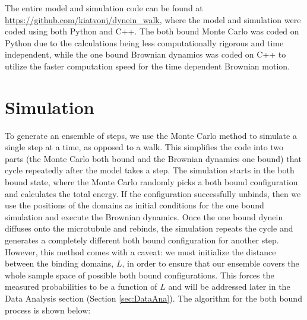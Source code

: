 
The entire model and simulation code can be found at \url{https://github.com/kiatvonj/dynein_walk}, where the model and simulation were coded using both Python and C++. The both bound Monte Carlo was coded on Python due to the calculations being less computationally rigorous and time independent, while the one bound Brownian dynamics was coded on C++ to utilize the faster computation speed for the time  dependent Brownian motion.

\section{Simulation}
To generate an ensemble of steps, we use the Monte Carlo method to simulate a single step at a time, as opposed to a walk. This simplifies the code into two parts (the Monte Carlo both bound and the Brownian dynamics one bound) that cycle repeatedly after the model takes a step. The simulation starts in the both bound state, where the Monte Carlo randomly picks a both bound configuration and calculates the total energy. If the configuration successfully unbinds, then we use the positions of the domains as initial conditions for the one bound simulation and execute the Brownian dynamics. Once the one bound dynein diffuses onto the microtubule and rebinds, the simulation repeats the cycle and generates a completely different both bound configuration for another step. However, this method comes with a caveat: we must initialize the distance between the binding domains, $L$, in order to ensure that our ensemble covers the whole sample space of possible both bound configurations. This forces the measured probabilities to be a function of $L$ and will be addressed later in the Data Analysis section (Section \ref{sec:DataAna}). The algorithm for the both bound process is shown below:

